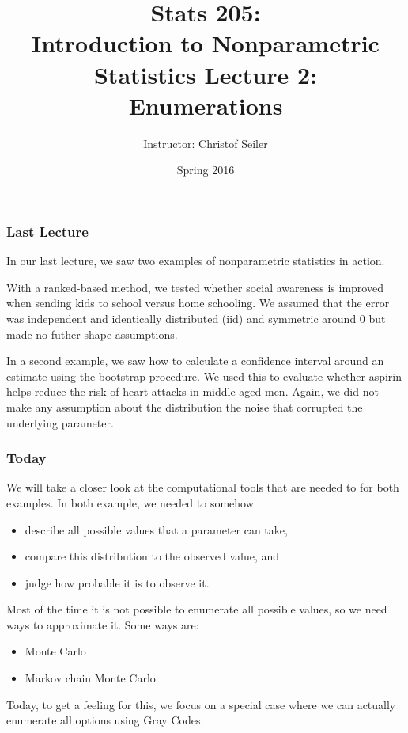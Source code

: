 \documentclass[10pt]{beamer}
\title{\large \bfseries Stats 205: \\ Introduction to Nonparametric Statistics \linebreak \linebreak \linebreak
Lecture 2: \\ Enumerations}
\author{Instructor: Christof Seiler}
\date{Spring 2016}
\begin{document}
\frame{
\thispagestyle{empty}
\titlepage
}

\begin{frame}
\frametitle{Last Lecture}

In our last lecture, we saw two examples of nonparametric statistics in action. \newline

With a ranked-based method, we tested whether social awareness is improved when sending kids to school versus home schooling.
We assumed that the error was independent and identically distributed (iid) and symmetric around $0$ but made no futher shape assumptions. \newline

In a second example, we saw how to calculate a confidence interval around an estimate using the bootstrap procedure. We used this to evaluate whether aspirin helps reduce the risk of heart attacks in middle-aged men. 
Again, we did not make any assumption about the distribution the noise that corrupted the underlying parameter. 

\end{frame}

\begin{frame}
\frametitle{Today}

We will take a closer look at the computational tools that are needed to for both examples. In both example, we needed to somehow 
\begin{itemize}
\item describe all possible values that a parameter can take, 
\item compare this distribution to the observed value, and 
\item judge how probable it is to observe it. 
\end{itemize}

\vspace{0.3cm}
Most of the time it is not possible to enumerate all possible values, so we need ways to approximate it. Some ways are:
\begin{itemize}
\item Monte Carlo
\item Markov chain Monte Carlo
\end{itemize}

\vspace{0.3cm}
Today, to get a feeling for this, we focus on a special case where we can actually enumerate all options using Gray Codes.

\end{frame}
\end{document}
